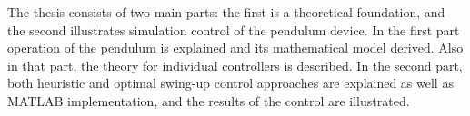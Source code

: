 The thesis consists of two main parts: the first is a theoretical foundation, and the second illustrates simulation control of the pendulum device. In the first part operation of the pendulum is explained and its mathematical model derived. Also in that part, the theory for individual controllers is described. In the second part, both heuristic and optimal swing-up control approaches are explained as well as \textsc{MATLAB} implementation, and the results of the control are illustrated.   
